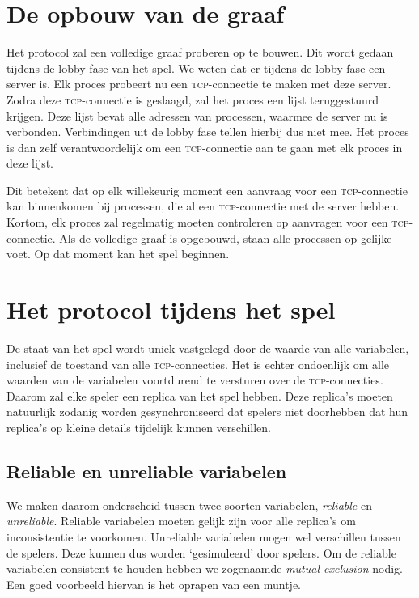 \documentclass[a4paper,11pt]{article}
\newcommand{\tcp}{\textsc{tcp}\xspace}
\begin{document}
    \section{De opbouw van de graaf}
    Het protocol zal een volledige graaf proberen op te bouwen. Dit wordt gedaan tijdens de lobby fase van het spel. We weten dat er tijdens de lobby fase een server is. Elk proces probeert nu een \tcp-connectie te maken met deze server. Zodra deze \tcp-connectie is geslaagd, zal het proces een lijst teruggestuurd krijgen. Deze lijst bevat alle adressen van processen, waarmee de server nu is verbonden. Verbindingen uit de lobby fase tellen hierbij dus niet mee. Het proces is dan zelf verantwoordelijk om een \tcp-connectie aan te gaan met elk proces in deze lijst.

    Dit betekent dat op elk willekeurig moment een aanvraag voor een \tcp-connectie kan binnenkomen bij processen, die al een \tcp-connectie met de server hebben. Kortom, elk proces zal regelmatig moeten controleren op aanvragen voor een \tcp-connectie. Als de volledige graaf is opgebouwd, staan alle processen op gelijke voet. Op dat moment kan het spel beginnen.

    \section{Het protocol tijdens het spel}
    \label{sec:tijdensspel}
    De staat van het spel wordt uniek vastgelegd door de waarde van alle variabelen, inclusief de toestand van alle \tcp-connecties. Het is echter ondoenlijk om alle waarden van de variabelen voortdurend te versturen over de \tcp-connecties. Daarom zal elke speler een replica van het spel hebben. Deze replica's moeten natuurlijk zodanig worden gesynchroniseerd dat spelers niet doorhebben dat hun replica's op kleine details tijdelijk kunnen verschillen.

    \subsection{Reliable en unreliable variabelen}
    We maken daarom onderscheid tussen twee soorten variabelen, \emph{reliable} en \emph{unreliable}. Reliable variabelen moeten gelijk zijn voor alle replica's om inconsistentie te voorkomen. Unreliable variabelen mogen wel verschillen tussen de spelers. Deze kunnen dus worden `gesimuleerd' door spelers. Om de reliable variabelen consistent te houden hebben we zogenaamde \emph{mutual exclusion} nodig. Een goed voorbeeld hiervan is het oprapen van een muntje.
\end{document}
